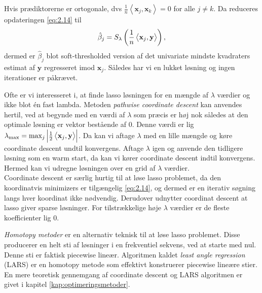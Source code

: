 Hvis prædiktorerne er ortogonale, dvs $\frac{1}{n} \left\langle \mathbf{x}_j, \mathbf{x}_k \right\rangle = 0$ for alle $j \neq k$.
Da reduceres opdateringen \eqref{eq:2.14} til
\begin{align*}
\hat{\beta}_j = S_\lambda \del{\frac{1}{n} \left\langle \mathbf{x}_j, \mathbf{y} \right\rangle},
\end{align*}
dermed er $\hat{\beta}_j$ blot soft-thresholded version af det univariate mindste kvadraters estimat af $\mathbf{y}$ regresseret imod $\mathbf{x}_j$. Således har vi en lukket løsning og ingen iterationer er påkrævet.

Ofte er vi interesseret i, at finde lasso løsningen for en mængde af \(\lambda\) værdier og ikke blot én fast lambda.
Metoden \textit{pathwise coordinate descent} kan anvendes hertil, ved at begynde med en værdi af \(\lambda\) som præcis er høj nok således at den optimale løsning er vektor bestående af \(0\).
Denne værdi er lig \(\lambda_{\max}=\max_j \left\vert \frac{1}{2} \left\langle \mathbf{x}_j, \mathbf{y} \right\rangle \right\vert\).
Da kan vi aftage \(\lambda\) med en lille mængde og køre coordinate descent undtil konvergens.
Aftage \(\lambda\) igen og anvende den tidligere løsning som en warm start, da kan vi kører coordinate descent indtil konvergens.
Hermed kan vi udregne løsningen over en grid af \(\lambda\) værdier. \\

Coordinate descent er særlig hurtig til at løse lasso problemet, da den koordinatvis minimizers er tilgængelig \eqref{eq:2.14}, og dermed er en iterativ søgning langs hver koordinat ikke nødvendig.
Derudover udnytter coordinat descent at lasso giver sparse løsninger.
For tilstrækkelige høje \(\lambda\) værdier er de fleste koefficienter lig $0$.

\textit{Homotopy metoder} er en alternativ teknisk til at løse lasso problemet. Disse producerer en helt sti af løsninger i en frekventiel sekvens, ved at starte med nul.
Denne sti er faktisk piecewise lineær.
Algoritmen kaldet \textit{least angle regression} (LARS) er en homotopy metode som effektivt konstruerer piecewise lineære stier.
En mere teoretisk gennemgang af coordinate descent og LARS algoritmen er givet i kapitel \ref{kap:optimeringsmetoder}.
%
